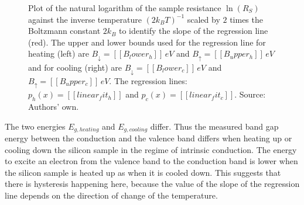 \documentclass[a4paper]{article}
\begin{document}
\begin{figure}[H]
\begin{minipage}[t]{0.5\textwidth}
	\end{minipage}
	\caption{Plot of the natural logarithm of the sample resistance $\ln{\left( R_S \right)}$ against the inverse temperature $\left(2 k_B T \right)^{-1}$ scaled by $2$ times the Boltzmann constant $2 k_B$ to identify the slope of the regression line (red). The upper and lower bounds used for the regression line for heating (left) are $B_{\downarrow} = [[B_lower_h]] \, eV$ and $B_{\uparrow} = [[B_upper_h]] \, eV$ and for cooling (right) are $B_{\downarrow} = [[B_lower_c]] \, eV$ and $B_{\uparrow} = [[B_upper_c]] \, eV$. The regression lines: $p_h(x) = [[linear_fit_h]]$ and $p_c(x) = [[linear_fit_c]]$. Source: Authors' own.}
	\label{fig:energy_gap}
\end{figure}

The two energies $E_{g,heating}$ and $E_{g,cooling}$ differ. Thus the measured band gap energy between the conduction and the valence band differs when heating up or cooling down the silicon sample in the regime of intrinsic conduction. The energy to excite an electron from the valence band to the conduction band is lower when the silicon sample is heated up as when it is cooled down. This suggests that there is hysteresis happening here, because the value of the slope of the regression line depends on the direction of change of the temperature.
\end{document}
